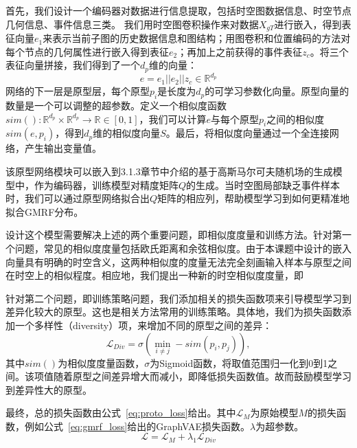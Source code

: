 \documentclass[12pt,UTF8,AutoFakeBold=2,a4paper]{ctexart} %
\begin{document}
首先，我们设计一个编码器对数据进行信息提取，包括时空图数据信息、时空节点几何信息、事件信息三类。%
我们用时空图卷积操作来对数据$X_{gT}$进行嵌入，得到表征向量$e_1$来表示当前子图的历史数据信息和图结构；用图卷积和位置编码的方法对每个节点的几何属性进行嵌入得到表征$e_2$；再加上之前获得的事件表征$z_c$。将三个表征向量拼接，我们得到了一个$d_p$维的向量：
\begin{equation}
    e = e_1 || e_2 || z_c \in \mathbb{R}^{d_p}
\end{equation}
网络的下一层是原型层，每个原型$p_i$是长度为$d_p$的可学习参数化向量。原型向量的数量是一个可以调整的超参数。定义一个相似度函数$sim(): \mathbb{R}^{d_p} \times \mathbb{R}^{d_p} \rightarrow \mathbb{R} \in [0,1]$，我们可以计算$e$与每个原型$p_i$之间的相似度$sim(e, p_i)$，得到$d_p$维的相似度向量$S$。最后，将相似度向量通过一个全连接网络，产生输出变量值。

该原型网络模块可以嵌入到3.1.3章节中介绍的基于高斯马尔可夫随机场的生成模型中，作为编码器，训练模型对精度矩阵$Q$的生成。当时空图局部缺乏事件样本时，我们可以通过原型网络拟合出$Q$矩阵的相应列，帮助模型学习到如何更精准地拟合GMRF分布。%

设计这个模型需要解决上述的两个重要问题，即相似度度量和训练方法。针对第一个问题，常见的相似度度量包括欧氏距离和余弦相似度。由于本课题中设计的嵌入向量具有明确的时空含义，这两种相似度的度量无法完全刻画输入样本与原型之间在时空上的相似程度。相应地，我们提出一种新的时空相似度度量，即


针对第二个问题，即训练策略问题，我们添加相关的损失函数项来引导模型学习到差异化较大的原型。这也是相关方法常用的训练策略。具体地，我们为损失函数添加一个多样性（diversity）项，来增加不同的原型之间的差异：
\begin{equation}
    \mathcal{L}_{Div} = \sigma(\min_{i\ne j} -sim(p_i, p_j)),
\end{equation}
其中$sim()$为相似度度量函数，$\sigma$为Sigmoid函数，将取值范围归一化到0到1之间。该项值随着原型之间差异增大而减小，即降低损失函数值。故而鼓励模型学习到差异性大的原型。

最终，总的损失函数由公式~\ref{eq:proto_loss}给出。其中$\mathcal{L}_M$为原始模型$M$的损失函数，例如公式~\ref{eq:gmrf_loss}给出的GraphVAE损失函数。$\lambda$为超参数。
\begin{equation}
    \mathcal{L} = \mathcal{L}_M + \lambda_1\mathcal{L}_{Div}
    \label{eq:proto_loss}
\end{equation}
\end{document}
